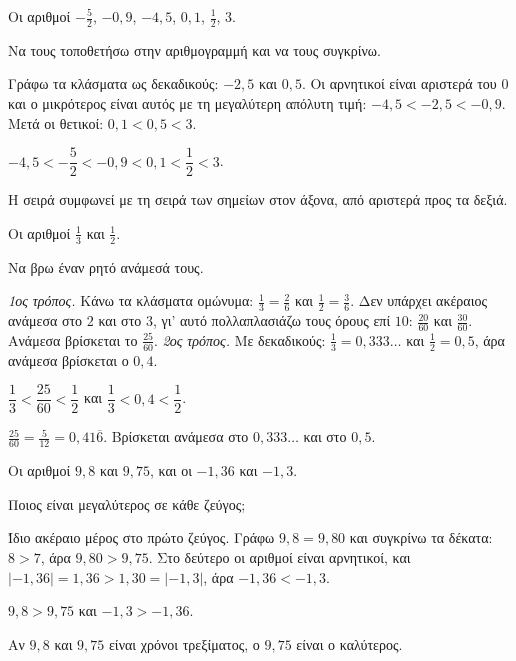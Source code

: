 \tixero Οι αριθμοί $-\frac{5}{2}$, $-0{,}9$, $-4{,}5$, $0{,}1$, $\frac{1}{2}$, $3$.\par
\tithelo Να τους τοποθετήσω στην αριθμογραμμή και να τους συγκρίνω.\par
\possindeo Γράφω τα κλάσματα ως δεκαδικούς: $-2{,}5$ και $0{,}5$. Οι αρνητικοί είναι αριστερά του $0$ και ο μικρότερος είναι αυτός με τη μεγαλύτερη απόλυτη τιμή: $-4{,}5<-2{,}5<-0{,}9$. Μετά οι θετικοί: $0{,}1<0{,}5<3$.\par
\apantisi $-4{,}5<-\dfrac{5}{2}<-0{,}9<0{,}1<\dfrac{1}{2}<3$.\par
\elegxos Η σειρά συμφωνεί με τη σειρά των σημείων στον άξονα, από αριστερά προς τα δεξιά.

\begin{center}
\end{center}

\tixero Οι αριθμοί $\frac{1}{3}$ και $\frac{1}{2}$.\par
\tithelo Να βρω έναν ρητό ανάμεσά τους.\par
\possindeo \emph{1ος τρόπος.} Κάνω τα κλάσματα ομώνυμα: $\frac{1}{3}=\frac{2}{6}$ και $\frac{1}{2}=\frac{3}{6}$. Δεν υπάρχει ακέραιος ανάμεσα στο $2$ και στο $3$, γι' αυτό πολλαπλασιάζω τους όρους επί $10$: $\frac{20}{60}$ και $\frac{30}{60}$. Ανάμεσα βρίσκεται το $\frac{25}{60}$. \emph{2ος τρόπος.} Με δεκαδικούς: $\frac{1}{3}=0{,}333\ldots$ και $\frac{1}{2}=0{,}5$, άρα ανάμεσα βρίσκεται ο $0{,}4$.\par
\apantisi $\dfrac{1}{3}<\dfrac{25}{60}<\dfrac{1}{2}$ και $\dfrac{1}{3}<0{,}4<\dfrac{1}{2}$.\par
\elegxos $\frac{25}{60}=\frac{5}{12}=0{,}41\overline{6}$. Βρίσκεται ανάμεσα στο $0{,}333\ldots$ και στο $0{,}5$.

\tixero Οι αριθμοί $9{,}8$ και $9{,}75$, και οι $-1{,}36$ και $-1{,}3$.\par
\tithelo Ποιος είναι μεγαλύτερος σε κάθε ζεύγος;\par
\possindeo Ίδιο ακέραιο μέρος στο πρώτο ζεύγος. Γράφω $9{,}8=9{,}80$ και συγκρίνω τα δέκατα: $8>7$, άρα $9{,}80>9{,}75$. Στο δεύτερο οι αριθμοί είναι αρνητικοί, και $|-1{,}36|=1{,}36>1{,}30=|-1{,}3|$, άρα $-1{,}36<-1{,}3$.\par
\apantisi $9{,}8>9{,}75$ και $-1{,}3>-1{,}36$.\par
\elegxos Αν $9{,}8$ και $9{,}75$ είναι χρόνοι τρεξίματος, ο $9{,}75$ είναι ο καλύτερος.

